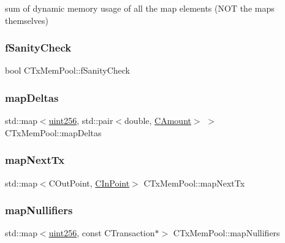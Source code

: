 sum of dynamic memory usage of all the map elements (N\+OT the maps themselves) 

\mbox{\label{class_c_tx_mem_pool_a1752e79ce537972fe87e252b9d07d2e0}} 
\subsubsection{\texorpdfstring{f\+Sanity\+Check}{fSanityCheck}}
{\footnotesize\ttfamily bool C\+Tx\+Mem\+Pool\+::f\+Sanity\+Check\hspace{0.3cm}{\ttfamily [private]}}

\mbox{\label{class_c_tx_mem_pool_a341709e31a39ce7a7a951a85c775c589}} 
\subsubsection{\texorpdfstring{map\+Deltas}{mapDeltas}}
{\footnotesize\ttfamily std\+::map$<$\mbox{\hyperlink{classuint256}{uint256}}, std\+::pair$<$double, \mbox{\hyperlink{amount_8h_a4eaf3a5239714d8c45b851527f7cb564}{C\+Amount}}$>$ $>$ C\+Tx\+Mem\+Pool\+::map\+Deltas}

\mbox{\label{class_c_tx_mem_pool_aae6f1162f0b2e42b369971f32a9f71e8}} 
\subsubsection{\texorpdfstring{map\+Next\+Tx}{mapNextTx}}
{\footnotesize\ttfamily std\+::map$<$C\+Out\+Point, \mbox{\hyperlink{class_c_in_point}{C\+In\+Point}}$>$ C\+Tx\+Mem\+Pool\+::map\+Next\+Tx}

\mbox{\label{class_c_tx_mem_pool_a1398b975c8c073096843991133a7bf0a}} 
\subsubsection{\texorpdfstring{map\+Nullifiers}{mapNullifiers}}
{\footnotesize\ttfamily std\+::map$<$\mbox{\hyperlink{classuint256}{uint256}}, const C\+Transaction$\ast$$>$ C\+Tx\+Mem\+Pool\+::map\+Nullifiers}

